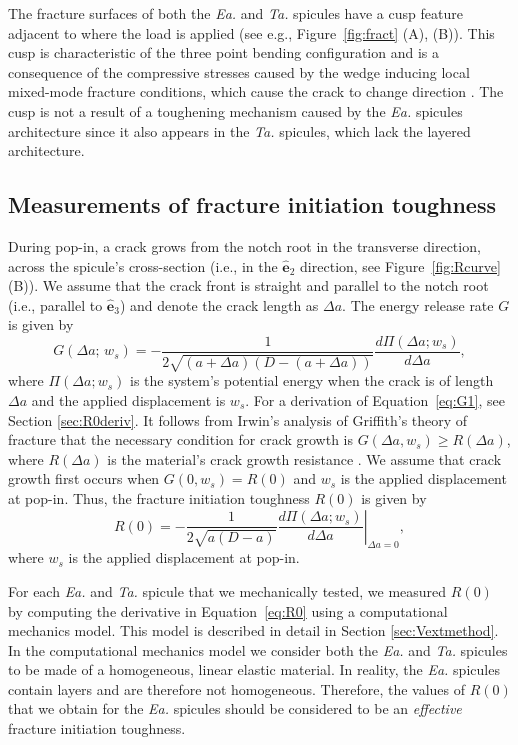 \documentclass[12pt,onecolumn]{article}
\makeatletter
\newcommand{\ey}{{\bm{\hat{e}}}_2}
\newcommand{\ez}{{\bm{\hat{e}}}_3}
\newcommand{\TA}{\textit{Ta.\@}\xspace}
\newcommand{\EA}{\textit{Ea.\@}\xspace}
\makeatother
\begin{document}
\begin{bibunit}
The fracture surfaces of both the \EA and \TA spicules have a cusp feature adjacent to where the load is applied (see e.g., Figure~\ref{fig:fract} (A), (B)). This cusp is characteristic of the three point bending configuration \cite{quinn2007fractography} and is a consequence of the compressive stresses caused by the wedge inducing local mixed-mode fracture conditions, which cause the crack to change direction \cite{anderson2017fracture}. The cusp is not a result of a toughening mechanism caused by the \EA spicules architecture since it also appears in the \TA spicules, which lack the layered architecture.


\subsection{Measurements of fracture initiation toughness}
\label{sec:Gc}
During pop-in, a crack grows from the notch root in the transverse direction, across the spicule's cross-section (i.e., in the $\ey$ direction, see Figure~\ref{fig:Rcurve} (B)). We assume that the crack front is straight and parallel to the notch root (i.e., parallel to $\ez$) and denote the crack length as $\Delta a$. The energy release rate $G$ is given by
%
\begin{equation}
    \label{eq:G1}
    G(\Delta a;\,w_s)=-\frac{1}{2\sqrt{(a+\Delta a)(D-(a+\Delta a))}}\frac{d\Pi(\Delta a; w_s)}{d\Delta a },
\end{equation}
%
where $\Pi(\Delta a;w_s)$ is the system's potential energy when the crack is of length $\Delta a$ and the applied displacement is $w_s$. For a derivation of Equation~\eqref{eq:G1}, see Section \ref{sec:R0deriv}. It follows from Irwin's analysis of Griffith's theory of fracture that the necessary condition for crack growth is $G(\Delta a,w_s)\geq R(\Delta a)$, where $R(\Delta a)$ is the material's crack growth resistance \cite{anderson2017fracture}. We assume that crack growth first occurs when $G(0,w_s)=R(0)$ and $w_s$ is the applied displacement at pop-in. Thus, the fracture initiation toughness $R(0)$ is given by
%
\begin{equation}
    \label{eq:R0}
    R(0)=-\frac{1}{2\sqrt{a(D-a)}} \left.\frac{d\Pi(\Delta a; w_s)}{d\Delta a }\right\vert_{\Delta a=0},
\end{equation}
%
where $w_s$ is the applied displacement at pop-in.

For each \EA and \TA spicule that we mechanically tested, we measured $R(0)$ by computing the derivative in Equation~\eqref{eq:R0} using a computational mechanics model. This model is described in detail in Section \ref{sec:Vextmethod}. In the computational mechanics model we consider both the \EA and \TA spicules to be made of a homogeneous, linear elastic material. In reality, the \EA spicules contain layers and are therefore not homogeneous. Therefore, the values of $R(0)$ that we obtain for the \EA spicules should be considered to be an \emph{effective} fracture initiation toughness.


\end{bibunit}
\end{document}
